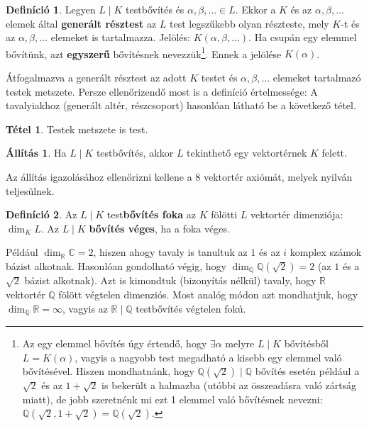 \documentclass[12pt]{book}
\theoremstyle{plain} %
\theoremstyle{definition} %
\newtheorem{defi/}{Definíció}[section]
\newenvironment{defi}
  {\renewcommand{\qedsymbol}{$\clubsuit$}%
   \pushQED{\qed}\begin{defi/}}
  {\popQED\end{defi/}}
\newtheorem{all/}{Állítás}[section]
\newenvironment{all}
{\renewcommand{\qedsymbol}{$\clubsuit$}%
	\pushQED{\qed}\begin{all/}}
	{\popQED\end{all/}}
\newtheorem{theo/}{Tétel}[section]
\newenvironment{theo}
  {\renewcommand{\qedsymbol}{$\clubsuit$}%
   \pushQED{\qed}\begin{theo/}}
  {\popQED\end{theo/}}
\theoremstyle{remark}
\renewcommand\qedsymbol{$\blacksquare$}
\numberwithin{equation}{section}  %
\begin{document}
	\begin{defi}
		Legyen $L\mid K$ testbővítés és $\alpha, \beta, \ldots \in L$. Ekkor a $K$ és az $\alpha, \beta, \ldots$ elemek által \textbf{generált résztest} az $L$ test legszűkebb olyan részteste, mely $K$-t és az $\alpha, \beta, \ldots$ elemeket is tartalmazza. Jelölés: $K(\alpha,\beta,\ldots)$. Ha csupán egy elemmel bővítünk, azt \textbf{egyszerű} bővítésnek nevezzük\footnote{Az egy elemmel bővítés úgy értendő, hogy $\exists \alpha$ melyre $L\mid K$ bővítésből $L=K(\alpha)$, vagyis a nagyobb test megadható a kisebb egy elemmel való bővítésével. Hiszen mondhatnánk, hogy $\mathbb{Q}(\sqrt{2}) \mid \mathbb{Q} $ bővítés esetén például a $\sqrt{2}$ és az $1+\sqrt{2}$ is bekerült a halmazba (utóbbi az összeadásra való zártság miatt), de jobb szeretnénk mi ezt 1 elemmel való bővítésnek nevezni: $\mathbb{Q}(\sqrt{2},1+\sqrt{2})= \mathbb{Q}(\sqrt{2})$. }. Ennek a jelölése $K(\alpha)$.
	\end{defi}

	Átfogalmazva a generált résztest az adott $K$ testet és $\alpha, \beta, \ldots$ elemeket tartalmazó testek metszete. Persze ellenőrizendő most is a definíció értelmessége: A tavalyiakhoz (generált altér, részcsoport) hasonlóan látható be a következő tétel.
	\begin{theo}
		Testek metszete is test.
	\end{theo}
	
	\begin{all}
		Ha $L\mid K$ testbővítés, akkor $L$ tekinthető egy vektortérnek $K$ felett.
	\end{all}

	Az állítás igazolásához ellenőrizni kellene a 8 vektortér axiómát, melyek nyilván teljesülnek.
	
	\begin{defi}
		Az $L\mid K$ test\textbf{bővítés foka} az $K$ fölötti $L$ vektortér dimenziója: $\dim_K L$. Az $L \mid K$ \textbf{bővítés véges}, ha a foka véges.
	\end{defi}
	
	Például $\dim_\mathbb{R} \mathbb{C} = 2$, hiszen ahogy tavaly is tanultuk az $1$ és az $i$ komplex számok bázist alkotnak. Hasonlóan gondolható végig, hogy $\dim_\mathbb{Q} \mathbb{Q}(\sqrt{2}) = 2$ (az $1$ és a $\sqrt{2}$ bázist alkotnak). Azt is kimondtuk (bizonyítás nélkül) tavaly, hogy $\mathbb{R}$ vektortér $\mathbb{Q}$ fölött végtelen dimenziós. Most analóg módon azt mondhatjuk, hogy $\dim_\mathbb{Q} \mathbb{R} = \infty$, vagyis az $\mathbb{R}\mid \mathbb{Q}$ testbővítés végtelen fokú.
	
\end{document}

